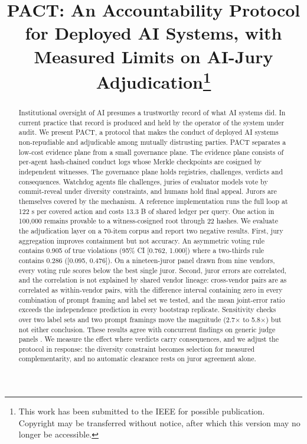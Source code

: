 \documentclass[conference]{IEEEtran}
\begin{document}
\title{PACT: An Accountability Protocol for Deployed AI Systems, with Measured Limits on AI-Jury Adjudication\thanks{This work has been submitted to the IEEE for possible publication. Copyright may be transferred without notice, after which this version may no longer be accessible.}}

\author{
}

\maketitle

\begin{abstract}
Institutional oversight of AI presumes a trustworthy record of what AI systems did. In current practice that record is produced and held by the operator of the system under audit. We present PACT, a protocol that makes the conduct of deployed AI systems non-repudiable and adjudicable among mutually distrusting parties. PACT separates a low-cost evidence plane from a small governance plane. The evidence plane consists of per-agent hash-chained conduct logs whose Merkle checkpoints are cosigned by independent witnesses. The governance plane holds registries, challenges, verdicts and consequences. Watchdog agents file challenges, juries of evaluator models vote by commit-reveal under diversity constraints, and humans hold final appeal. Jurors are themselves covered by the mechanism. A reference implementation runs the full loop at 122 \textmu{}s per covered action and costs 13.3 B of shared ledger per query. One action in 100,000 remains provable to a witness-cosigned root through 22 hashes. We evaluate the adjudication layer on a 70-item corpus and report two negative results. First, jury aggregation improves containment but not accuracy. An asymmetric voting rule contains 0.905 of true violations (95\% CI [0.762, 1.000]) where a two-thirds rule contains 0.286 ([0.095, 0.476]). On a nineteen-juror panel drawn from nine vendors, every voting rule scores below the best single juror. Second, juror errors are correlated, and the correlation is not explained by shared vendor lineage: cross-vendor pairs are as correlated as within-vendor pairs, with the difference interval containing zero in every combination of prompt framing and label set we tested, and the mean joint-error ratio exceeds the independence prediction in every bootstrap replicate. Sensitivity checks over two label sets and two prompt framings move the magnitude (2.7$\times$ to 5.8$\times$) but not either conclusion. These results agree with concurrent findings on generic judge panels \cite{r39,r40}. We measure the effect where verdicts carry consequences, and we adjust the protocol in response: the diversity constraint becomes selection for measured complementarity, and no automatic clearance rests on juror agreement alone.
\end{abstract}
\end{document}

